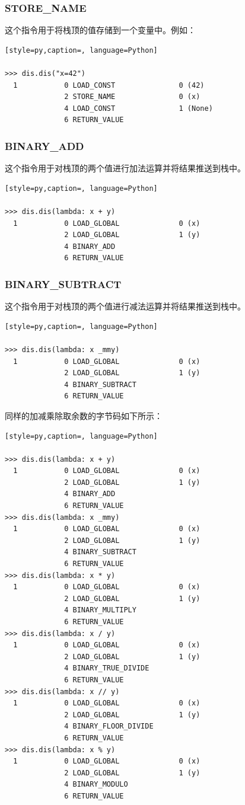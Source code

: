 \subsubsection{STORE\_NAME}
这个指令用于将栈顶的值存储到一个变量中。例如：
\begin{lstlisting}[style=py,caption=, language=Python]

>>> dis.dis("x=42")
  1           0 LOAD_CONST               0 (42)
              2 STORE_NAME               0 (x)
              4 LOAD_CONST               1 (None)
              6 RETURN_VALUE
\end{lstlisting}
\subsubsection{BINARY\_ADD}
这个指令用于对栈顶的两个值进行加法运算并将结果推送到栈中。
\begin{lstlisting}[style=py,caption=, language=Python]

>>> dis.dis(lambda: x + y)
  1           0 LOAD_GLOBAL              0 (x)
              2 LOAD_GLOBAL              1 (y)
              4 BINARY_ADD
              6 RETURN_VALUE
\end{lstlisting}
\subsubsection{BINARY\_SUBTRACT}
这个指令用于对栈顶的两个值进行减法运算并将结果推送到栈中。
\begin{lstlisting}[style=py,caption=, language=Python]

>>> dis.dis(lambda: x _mmy) 
  1           0 LOAD_GLOBAL              0 (x)
              2 LOAD_GLOBAL              1 (y)
              4 BINARY_SUBTRACT
              6 RETURN_VALUE
\end{lstlisting}
同样的加减乘除取余数的字节码如下所示：
\begin{lstlisting}[style=py,caption=, language=Python]

>>> dis.dis(lambda: x + y)
  1           0 LOAD_GLOBAL              0 (x)
              2 LOAD_GLOBAL              1 (y)
              4 BINARY_ADD
              6 RETURN_VALUE
>>> dis.dis(lambda: x _mmy) 
  1           0 LOAD_GLOBAL              0 (x)
              2 LOAD_GLOBAL              1 (y)
              4 BINARY_SUBTRACT
              6 RETURN_VALUE
>>> dis.dis(lambda: x * y)
  1           0 LOAD_GLOBAL              0 (x)
              2 LOAD_GLOBAL              1 (y)
              4 BINARY_MULTIPLY
              6 RETURN_VALUE
>>> dis.dis(lambda: x / y)
  1           0 LOAD_GLOBAL              0 (x)
              2 LOAD_GLOBAL              1 (y)
              4 BINARY_TRUE_DIVIDE
              6 RETURN_VALUE
>>> dis.dis(lambda: x // y)
  1           0 LOAD_GLOBAL              0 (x)
              2 LOAD_GLOBAL              1 (y)
              4 BINARY_FLOOR_DIVIDE
              6 RETURN_VALUE
>>> dis.dis(lambda: x % y)
  1           0 LOAD_GLOBAL              0 (x)
              2 LOAD_GLOBAL              1 (y)
              4 BINARY_MODULO
              6 RETURN_VALUE
\end{lstlisting}
